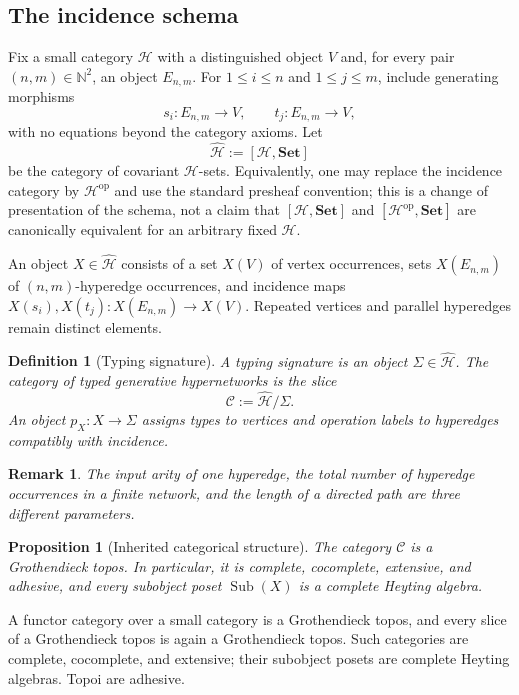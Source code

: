 \documentclass[12pt,a4paper,twoside]{extarticle}
\makeatletter
\theoremstyle{compactplain}
\newtheorem{proposition}[theorem]{Proposition}
\theoremstyle{compactdef}
\newtheorem{definition}[theorem]{Definition}
\newtheorem{remark}[theorem]{Remark}
\renewenvironment{proof}[1][\proofname]{\par\pushQED{\qed}\normalfont
  \topsep2pt\trivlist\item[\hskip\labelsep\bfseries #1\@addpunct{.}]\ignorespaces}
 {\popQED\endtrivlist\@endpefalse}
\newcommand{\Sub}{\operatorname{Sub}}
\makeatother
\begin{document}
\subsection{The incidence schema}
Fix a small category $\mathcal H$ with a distinguished object $V$ and, for every pair $(n,m)\in\mathbb N^2$, an object $E_{n,m}$. For $1\le i\le n$ and $1\le j\le m$, include generating morphisms
\[
s_i:E_{n,m}\to V,\qquad t_j:E_{n,m}\to V,
\]
with no equations beyond the category axioms. Let
\[
\widehat{\mathcal H}:=[\mathcal H,\mathbf{Set}]
\]
be the category of covariant $\mathcal H$-sets. Equivalently, one may replace the incidence category by $\mathcal H^{\mathrm{op}}$ and use the standard presheaf convention; this is a change of presentation of the schema, not a claim that $[\mathcal H,\mathbf{Set}]$ and $[\mathcal H^{\mathrm{op}},\mathbf{Set}]$ are canonically equivalent for an arbitrary fixed $\mathcal H$.

An object $X\in\widehat{\mathcal H}$ consists of a set $X(V)$ of vertex occurrences, sets $X(E_{n,m})$ of $(n,m)$-hyperedge occurrences, and incidence maps $X(s_i),X(t_j):X(E_{n,m})\to X(V)$. Repeated vertices and parallel hyperedges remain distinct elements.

\begin{definition}[Typing signature]
A typing signature is an object $\Sigma\in\widehat{\mathcal H}$. The category of typed generative hypernetworks is the slice
\[
\mathcal C:=\widehat{\mathcal H}/\Sigma.
\]
An object $p_X:X\to\Sigma$ assigns types to vertices and operation labels to hyperedges compatibly with incidence.
\end{definition}

\begin{remark}
The input arity of one hyperedge, the total number of hyperedge occurrences in a finite network, and the length of a directed path are three different parameters.
\end{remark}

\begin{proposition}[Inherited categorical structure]\label{prop:topos}
The category $\mathcal C$ is a Grothendieck topos. In particular, it is complete, cocomplete, extensive, and adhesive, and every subobject poset $\Sub(X)$ is a complete Heyting algebra.
\end{proposition}
\begin{proof}
A functor category over a small category is a Grothendieck topos, and every slice of a Grothendieck topos is again a Grothendieck topos. Such categories are complete, cocomplete, and extensive; their subobject posets are complete Heyting algebras. Topoi are adhesive.
\end{proof}
\end{document}
